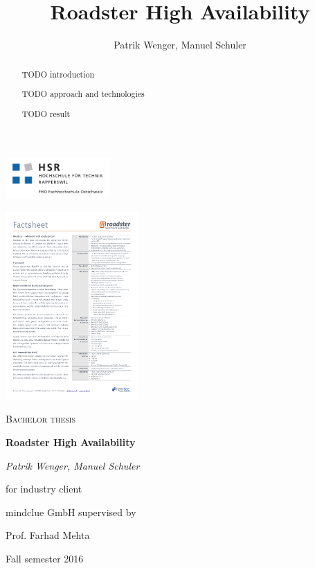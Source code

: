 \documentclass[a4paper]{report}
\title{Roadster High Availability}
\author{Patrik Wenger, Manuel Schuler}
\begin{document}
\thispagestyle{empty}

\begin{titlepage}
\centering
\begin{raggedleft}\includegraphics[trim=10 10 10 10, clip=true, width=0.3\textwidth]{img/hsr_logo.pdf}\end{raggedleft}
\begin{raggedright}\hfill\includegraphics[trim=14.8cm 27cm 1cm 1.4cm, clip=true, width=0.38\textwidth]{img/roadster_factsheet.pdf}\end{raggedright}

\par\vspace{30mm}
{\scshape\Large Bachelor thesis\par}
\vspace{1.5cm}
{\huge\bfseries Roadster High Availability\par}
\vspace{2cm}
{\Large\itshape Patrik Wenger, Manuel Schuler\par}
\vfill
for industry client\par
mindclue GmbH
\vfill
supervised by\par
Prof. Farhad Mehta

\vfill

{\large Fall semester 2016\par}
\end{titlepage}

\begin{abstract}

TODO introduction

TODO approach and technologies

TODO result

\end{abstract}
\end{document}
